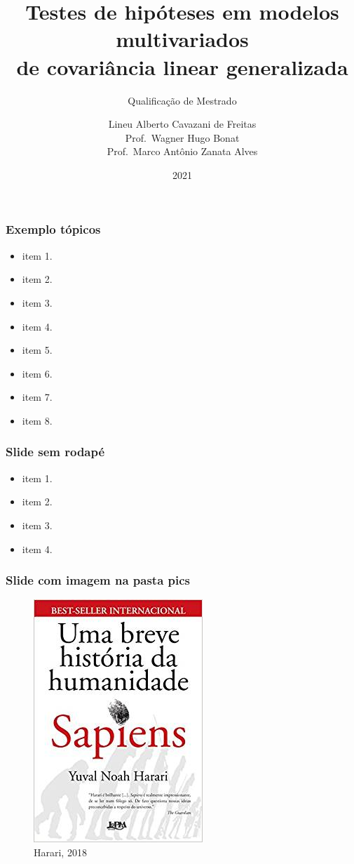 \documentclass[handout,serif, professionalfont, usenames, dvipsnames, aspectratio = 169]{beamer}\usepackage[]{graphicx}\usepackage[]{color}
\title[TH · McGLM]{
  \LARGE \bf Testes de hipóteses em modelos multivariados\\ de covariância linear generalizada 
}
\subtitle[Qualificação]{
  \large { Qualificação de Mestrado}
}
\author[Lineu Alberto $\cdot$ PPGInformatica UFPR]{%
      Lineu Alberto Cavazani de Freitas \\
      Prof.~Wagner Hugo Bonat \\
      Prof.~Marco Antônio Zanata Alves%
}
\date{2021}
\begin{document}
\begin{frame}[plain]
   \titlepage
\end{frame}


\begin{frame}
  \frametitle{Exemplo tópicos}
  \begin{itemize}
    \itemsep 2ex
  \item item 1. 
  \item item 2. 
  \item item 3. 
  \item item 4. 
  \item item 5. 
  \item item 6. 
  \item item 7. 
  \item item 8. 
  \end{itemize}
\end{frame}


\begin{frame}[plain]
  \frametitle{Slide sem rodapé}

\begin{itemize}
\item item 1.
\item item 2.
\item item 3.
\item item 4.
\end{itemize}

\end{frame}


\begin{frame}
  \frametitle{Slide com imagem na pasta pics}

\begin{figure}
    \centering
    \includegraphics[width=.3\linewidth]{./pics/sapiens.jpeg}
    \caption{Harari, 2018}
\nocite{harari}
\end{figure}

\end{frame}
\end{document}
